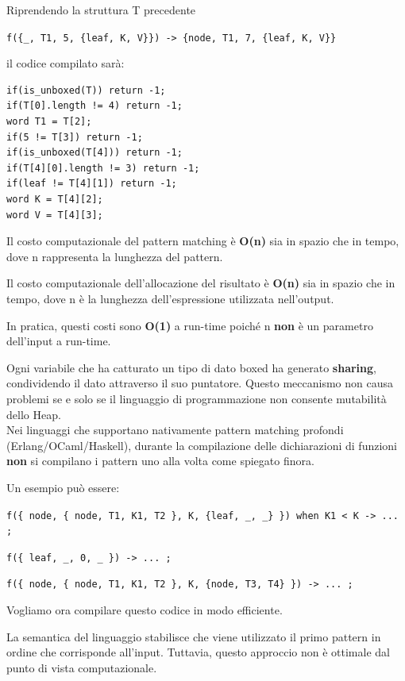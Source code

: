 \documentclass{article}
\begin{document}
Riprendendo la struttura T precedente 
\begin{center}
    \texttt{f(\{\_, T1, 5, \{leaf, K, V\}\}) -> \{node, T1, 7, \{leaf, K, V\}\}}
\end{center}
il codice compilato sarà:
\begin{tcolorbox}
\begin{verbatim}
if(is_unboxed(T)) return -1;
if(T[0].length != 4) return -1;
word T1 = T[2];
if(5 != T[3]) return -1;
if(is_unboxed(T[4])) return -1;
if(T[4][0].length != 3) return -1;
if(leaf != T[4][1]) return -1;
word K = T[4][2];
word V = T[4][3];
\end{verbatim}
\end{tcolorbox}

Il costo computazionale del pattern matching è \textbf{O(n)} sia in spazio che in tempo, dove n rappresenta la lunghezza del pattern.

Il costo computazionale dell'allocazione del risultato è \textbf{O(n)} sia in spazio che in tempo, dove n è la lunghezza dell'espressione utilizzata nell'output.

In pratica, questi costi sono \textbf{O(1)} a run-time poiché n \textbf{non} è un parametro dell'input a run-time.

Ogni variabile che ha catturato un tipo di dato boxed ha generato \textbf{sharing}, condividendo il dato attraverso il suo puntatore. Questo meccanismo non causa problemi se e solo se il linguaggio di programmazione non consente mutabilità dello Heap.\vspace{14pt}\\
Nei linguaggi che supportano nativamente pattern matching profondi (Erlang/OCaml/Haskell), durante la compilazione delle dichiarazioni di funzioni \textbf{non} si compilano i pattern uno alla volta come spiegato finora.

Un esempio può essere:
\begin{center}
    \texttt{f(\{ node, \{ node, T1, K1, T2 \}, K, \{leaf, \_, \_\} \}) when K1 < K -> ... ;}

    \texttt{f(\{ leaf, \_, 0, \_ \}) -> ... ;}

    \texttt{f(\{ node, \{ node, T1, K1, T2 \}, K, \{node, T3, T4\} \}) -> ... ;}
\end{center}
Vogliamo ora compilare questo codice in modo efficiente.

La semantica del linguaggio stabilisce che viene utilizzato il primo pattern in ordine che corrisponde all'input. Tuttavia, questo approccio non è ottimale dal punto di vista computazionale.
\end{document}
